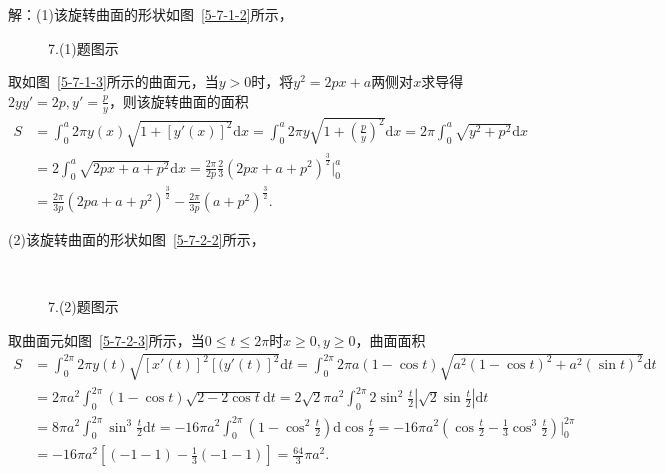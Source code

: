 \documentclass[12pt,UTF8]{ctexart}
\begin{document}
\begin{enumerate}
解：(1)该旋转曲面的形状如图~\ref{5-7-1-2}所示，
\begin{figure}[H]
\begin{center}
\end{center}
\caption{7.(1)题图示}
\label{5-7-1}
\end{figure}
取如图~\ref{5-7-1-3}所示的曲面元，当$y>0$时，将$y^2=2px+a$两侧对$x$求导得$2yy'=2p,y'=\frac py$，则该旋转曲面的面积
\[\begin{split}
S&=\int_0^a2\pi y(x)\sqrt{1+[y'(x)]^2}\mathrm dx=\int_0^a2\pi y\sqrt{1+(\frac py)^2}\mathrm dx=2\pi\int_0^a\sqrt{y^2+p^2}\mathrm dx\\
&=2\int_0^a\sqrt{2px+a+p^2}\mathrm dx=\frac{2\pi}{2p}\frac23(2px+a+p^2)^{\frac32}\Big|_0^a\\
&=\frac{2\pi}{3p}(2pa+a+p^2)^{\frac32}-\frac{2\pi}{3p}(a+p^2)^{\frac32}.
\end{split}\]

(2)该旋转曲面的形状如图~\ref{5-7-2-2}所示，
\begin{figure}[H]
\begin{center}
    \\
\end{center}
\caption{7.(2)题图示}
\label{5-7-2}
\end{figure}
取曲面元如图~\ref{5-7-2-3}所示，当$0\leq t\leq 2\pi$时$x\geq0,y\geq0$，曲面面积
\[\begin{split}
S&=\int_0^{2\pi}2\pi y(t)\sqrt{[x'(t)]^2[(y'(t)]^2}\mathrm dt=\int_0^{2\pi}2\pi a(1-\cos t)\sqrt{a^2(1-\cos t)^2+a^2(\sin t)^2}\mathrm dt\\
&=2\pi a^2\int_0^{2\pi}(1-\cos t)\sqrt{2-2\cos t}\mathrm dt=2\sqrt2\pi a^2\int_0^{2\pi}2\sin^2\frac t2|\sqrt2\sin\frac t2|\mathrm dt\\
&=8\pi a^2\int_0^{2\pi}\sin^3\frac t2\mathrm dt=-16\pi a^2\int_0^{2\pi}(1-\cos^2\frac t2)\mathrm d\cos\frac t2=-16\pi a^2(\cos\frac t2-\frac13\cos^3\frac t2)\Big|_0^{2\pi}\\
&=-16\pi a^2[(-1-1)-\frac13(-1-1)]=\frac{64}3\pi a^2.
\end{split}\]
\end{enumerate}
\end{document}
